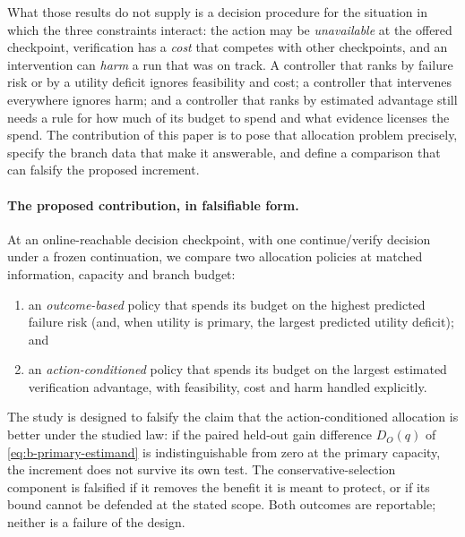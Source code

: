 What those results do not supply is a decision procedure for the situation in
which the three constraints interact: the action may be \emph{unavailable} at
the offered checkpoint, verification has a \emph{cost} that competes with other
checkpoints, and an intervention can \emph{harm} a run that was on track.  A
controller that ranks by failure risk or by a utility deficit ignores
feasibility and cost; a controller that intervenes everywhere ignores harm; and
a controller that ranks by estimated advantage still needs a rule for how much
of its budget to spend and what evidence licenses the spend.  The contribution
of this paper is to pose that allocation problem precisely, specify the branch
data that make it answerable, and define a comparison that can falsify the
proposed increment.

\paragraph{The proposed contribution, in falsifiable form.}
At an online-reachable decision checkpoint, with one continue/verify decision
under a frozen continuation, we compare two allocation policies at matched
information, capacity and branch budget:
\begin{enumerate}[label=(B\arabic*),leftmargin=2.6em]
\item an \emph{outcome-based} policy that spends its budget on the highest
  predicted failure risk (and, when utility is primary, the largest predicted
  utility deficit); and
\item an \emph{action-conditioned} policy that spends its budget on the largest
  estimated verification advantage, with feasibility, cost and harm handled
  explicitly.
\end{enumerate}
The study is designed to falsify the claim that the action-conditioned
allocation is better under the studied law: if the paired held-out gain
difference $D_O(q)$ of \cref{eq:b-primary-estimand} is indistinguishable from
zero at the primary capacity, the increment does not survive its own test.  The
conservative-selection component is falsified if it removes the benefit it is
meant to protect, or if its bound cannot be defended at the stated scope.  Both
outcomes are reportable; neither is a failure of the design.

